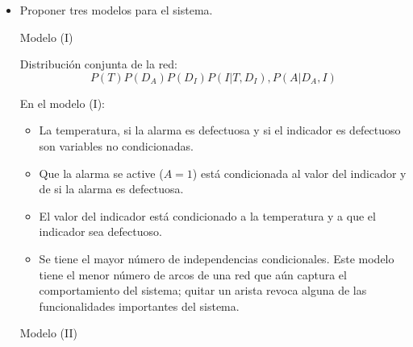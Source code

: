 \documentclass[letterpaper,11pt]{article}
\begin{document}
\begin{itemize}
    \item Proponer tres modelos para el sistema. 
        \begin{multicols}{2}
     Modelo (I)
\begin{center}

Distribución conjunta de la red: \[P(T)P(D_A)P(D_I)P(I|T,D_I),P(A|D_A,I)\]
    \vfill\null
    \columnbreak
\end{center}
\noindent En el modelo (I):
    \begin{itemize}[$\bullet$]
        \item La temperatura, si la alarma es defectuosa y si el indicador es defectuoso son variables no
            condicionadas. 
        \item Que la alarma se active ($A=1$) está condicionada al valor del indicador y de si la alarma
            es defectuosa. 
        \item El valor del indicador está condicionado a la temperatura y a que el indicador sea defectuoso. 
        \item Se tiene el mayor número de independencias condicionales. Este modelo tiene el menor número de arcos de
            una red que aún captura el comportamiento del sistema; quitar un arista revoca alguna de las funcionalidades
            importantes del sistema.
    \end{itemize}
\end{multicols}
\vspace{\baselineskip}
\begin{multicols}{2}
     Modelo (II) 
\begin{center}
\end{center}
\end{multicols}
\end{itemize}
\end{document}
